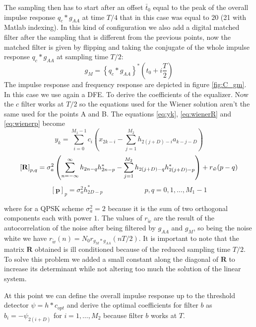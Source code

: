 \documentclass[a4paper,11.5pt]{article}
\newcommand{\vt}{\boldsymbol}
\begin{document}
The sampling then has to start after an offset $\bar{t}_0$ equal to the peak of the overall impulse response $q_c*g_{AA}$ at time $T/4$ that in this case was equal to $20$ (21 with Matlab indexing).  
In this kind of configuration we also add a digital matched filter after the sampling that is different from the previous points, now the matched filter is given by flipping and taking the conjugate of the whole impulse response $q_c*g_{AA}$ at sampling time $T/2$:
\begin{equation}
g_M = \left\{ q_c * g_{AA} \right\}^* \left(t_0 + i \frac{T}{2}\right) 
\end{equation}
The impulse response and frequency response are depicted in figure \ref{fig:C_gm}. 
In this case we use again a DFE. To derive the coefficients of the equalizer. Now the $c$ filter works at $T/2$ so the equations used for the Wiener solution aren't the same used for the points A and B. The equations \ref{eq:yk}, \ref{eq:wienerR} and \ref{eq:wienerp} become
\begin{equation} \label{eq:C_yk}
y_k = \sum_{i=0}^{M_1-1}c_i \left(x_{2k-i}-\sum_{j=1}^{M_2}h_{2(j+D)-i}a_{k-j-D} \right)
\end{equation}
\begin{equation} \label{eq:C_wienerR}
\mathbf{[R]}_{p,q}  = \sigma_a^2 \left( \sum_{n=-\infty}^{\infty}h_{2n-q}h^*_{2n-p}-\sum_{j=1}^{M_2}h_{2(j+D)-q}h^*_{2(j+D)-p} \right) + r_{\tilde{w}}(p-q) \\
\end{equation}
\begin{equation} \label{eq:C_wienerp}
\mathbf{[p]}_p = \sigma_a^2 h^*_{2D-p} \quad\quad\quad\quad\quad\quad p,q = 0,1,\dots,M_1-1
\end{equation}

where for a QPSK scheme $\sigma_a^2=2$ because it is the sum of two orthogonal components each with power $1$. The values of $r_{\tilde{w}}$ are the result of the autocorrelation of the noise after being filtered by $g_{AA}$ and $g_M$, so being the noise white we have $r_{\tilde{w}}(n)=N_0r_{g_M * g_{AA}}(nT/2)$. It is important to note that the matrix $\vt{R}$ obtained is ill conditioned because of the reduced sampling time $T/2$. To solve this problem we added a small constant along the diagonal of $\vt{R}$ to increase its determinant while not altering too much the solution of the linear system.

 At this point we can define the overall impulse response up to the threshold detector $\psi = h*c_{opt}$ and derive the optimal coefficients for filter $b$ as $b_i=-\psi_{2(i+D)}$ for $i=1,\dots,M_2$ because filter $b$ works at $T$. 
\end{document}
